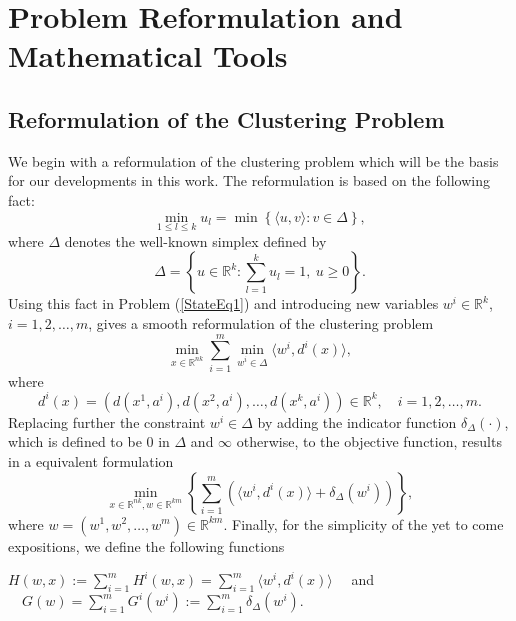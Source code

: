  \chapter{Problem Reformulation and Mathematical Tools} \label{Chapter2}

\noindent \noindent \hrulefill

\section{Reformulation of the Clustering Problem} \label{State_Clustering_Reformulation}

We begin with a reformulation of the clustering problem which will be the basis for our developments in this work. The reformulation is based on the following fact:
\begin{equation*}
	\min\limits_{1 \leq l \leq k} u_l = \min \left\lbrace \langle u,v \rangle : v \in \Delta \right\rbrace ,
\end{equation*}
where $\Delta$ denotes the well-known simplex defined by
\begin{equation*}
	\Delta = \left\lbrace u \in \mathbb{R}^k : \sum\limits_{l=1}^{k} u_l = 1, \: u \geq 0 \right\rbrace .
\end{equation*}
Using this fact in Problem (\ref{StateEq1}) and introducing new variables $w^i \in \mathbb{R}^k$, $i=1,2, \ldots, m$, gives a smooth reformulation of the clustering problem
\begin{equation}
	\min\limits_{x \in \mathbb{R}^{nk}} \sum\limits_{i=1}^{m} \min\limits_{w^i \in \Delta} \langle w^i , d^i(x) \rangle , \label{StateEq2}
\end{equation}
where 
\begin{equation*}
d^{i}(x) = (d(x^1,a^i), d(x^2,a^i), \ldots , d(x^k,a^i)) \in \mathbb{R}^k, \quad i=1, 2, \ldots , m.
\end{equation*}
Replacing further the constraint $w^i \in \Delta$ by adding the indicator function $\delta_{\Delta}(\cdot)$, which is defined to be $0$ in $\Delta$ and $\infty$ otherwise, to the objective function, results in a equivalent formulation
\begin{equation}
	\min\limits_{x \in \mathbb{R}^{nk} , w \in \mathbb{R}^{km}} \left\lbrace \sum\limits_{i=1}^{m} \left( \langle w^i , d^i(x) \rangle + \delta_{\Delta}(w^i) \right) \right\rbrace , \label{StateEq3}
\end{equation}
where $w = (w^1, w^2, \ldots , w^m) \in \mathbb{R}^{km}$.
Finally, for the simplicity of the yet to come expositions, we define the following functions
\begin{center}
$H(w,x) := \sum\limits_{i=1}^{m} H^i(w,x) = \sum\limits_{i=1}^{m} \langle w^i , d^i(x) \rangle \quad$ and $\quad G(w) = \sum\limits_{i=1}^{m} G^i(w^i) := \sum\limits_{i=1}^{m} \delta_{\Delta}(w^i) .$
\end{center}

